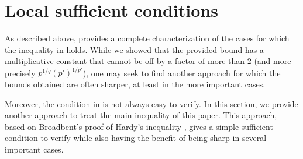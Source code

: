 \documentclass[oneside,10pt]{article}          %
\numberwithin{equation}{section}
\begin{document}






\section{Local sufficient conditions}\label{sec - local}

As described above,  provides a complete characterization of the cases for which the inequality in  holds. While we showed that the provided bound has a multiplicative constant that cannot be off by a factor of more than $2$ (and more precisely $p^{1/q}(p')^{1/p'}$), one may seek to find another approach for which the bounds obtained are often sharper, at least in the more important cases. 

Moreover, the condition in  is not always easy to verify. In this section, we provide another approach to treat the main inequality of this paper. This approach, based on Broadbent’s proof of Hardy's inequality \cite{MR1574000}, gives a simple sufficient condition to verify while also having the benefit of being sharp in several important cases.
\end{document}
